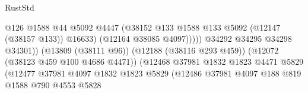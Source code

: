 \begin{lexlean}{RustStd}
\begin{coremodule}
                                                            @126
                                                            @1588
                                                            @44
                                                            @5092
                                                            @4447
                                                            (@38152
                                                              @133
                                                              @1588
                                                              @133
                                                              @5092
                                                              (@12147 (@38157 @133))
                                                              @16633)
                                                            (@12164 @38085 @4097)))))
                                                    @34292
                                                    @34295
                                                    @34298
                                                    @34301))
                                                (@13809 (@38111 @96))
                                                (@12188 (@38116 @293 @459))
                                                (@12072 (@38123 @459 @100 @4686 @4471))
                                                (@12468
                                                  @37981
                                                  @1832
                                                  @1823
                                                  @4471
                                                  @5829
                                                  (@12477
                                                    @37981
                                                    @4097
                                                    @1832
                                                    @1823
                                                    @5829
                                                    (@12486
                                                      @37981
                                                      @4097
                                                      @188
                                                      @819
                                                      @1588
                                                      @790
                                                      @4553
                                                      @5828

\end{coremodule}
\end{lexlean}
